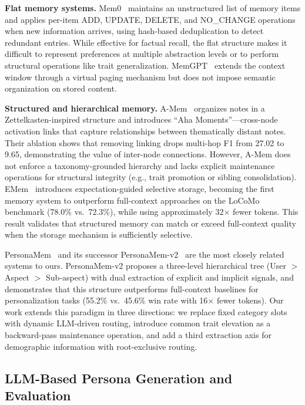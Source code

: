 \documentclass[manuscript,screen,review]{acmart}
\begin{document}
\textbf{Flat memory systems.}
Mem0~\cite{mem0} maintains an unstructured list of memory items and applies per-item ADD, UPDATE, DELETE, and NO\_CHANGE operations when new information arrives, using hash-based deduplication to detect redundant entries. While effective for factual recall, the flat structure makes it difficult to represent preferences at multiple abstraction levels or to perform structural operations like trait generalization. MemGPT~\cite{memgpt} extends the context window through a virtual paging mechanism but does not impose semantic organization on stored content.

\textbf{Structured and hierarchical memory.}
A-Mem~\cite{amem} organizes notes in a Zettelkasten-inspired structure and introduces ``Aha Moments''---cross-node activation links that capture relationships between thematically distant notes. Their ablation shows that removing linking drops multi-hop F1 from 27.02 to 9.65, demonstrating the value of inter-node connections. However, A-Mem does not enforce a taxonomy-grounded hierarchy and lacks explicit maintenance operations for structural integrity (e.g., trait promotion or sibling consolidation).
EMem~\cite{emem} introduces expectation-guided selective storage, becoming the first memory system to outperform full-context approaches on the LoCoMo benchmark (78.0\% vs.\ 72.3\%), while using approximately 32$\times$ fewer tokens. This result validates that structured memory can match or exceed full-context quality when the storage mechanism is sufficiently selective.

PersonaMem~\cite{personamem} and its successor PersonaMem-v2~\cite{personamem-v2} are the most closely related systems to ours. PersonaMem-v2 proposes a three-level hierarchical tree (User $>$ Aspect $>$ Sub-aspect) with dual extraction of explicit and implicit signals, and demonstrates that this structure outperforms full-context baselines for personalization tasks (55.2\% vs.\ 45.6\% win rate with 16$\times$ fewer tokens). Our work extends this paradigm in three directions: we replace fixed category slots with dynamic LLM-driven routing, introduce common trait elevation as a backward-pass maintenance operation, and add a third extraction axis for demographic information with root-exclusive routing.

\subsection{LLM-Based Persona Generation and Evaluation}
\end{document}
